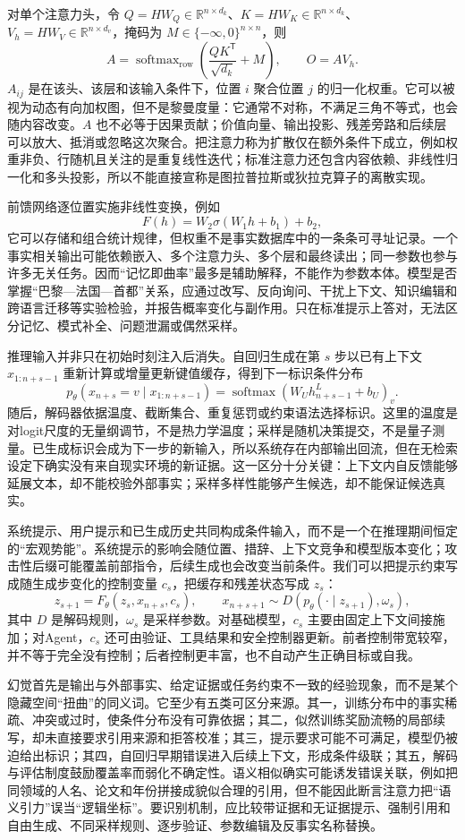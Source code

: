 对单个注意力头，令 $Q=HW_Q\in\mathbb R^{n\times d_k}$、$K=HW_K\in\mathbb R^{n\times d_k}$、$V_h=HW_V\in\mathbb R^{n\times d_v}$，掩码为 $M\in\{-\infty,0\}^{n\times n}$，则
\[
A=\operatorname{softmax}_{\mathrm{row}}
\left(\frac{QK^{\mathsf T}}{\sqrt{d_k}}+M\right),
\qquad
O=AV_h.
\]
$A_{ij}$ 是在该头、该层和该输入条件下，位置 $i$ 聚合位置 $j$ 的归一化权重。它可以被视为动态有向加权图，但不是黎曼度量：它通常不对称，不满足三角不等式，也会随内容改变。$A$ 也不必等于因果贡献；价值向量、输出投影、残差旁路和后续层可以放大、抵消或忽略这次聚合。把注意力称为扩散仅在额外条件下成立，例如权重非负、行随机且关注的是重复线性迭代；标准注意力还包含内容依赖、非线性归一化和多头投影，所以不能直接宣称是图拉普拉斯或狄拉克算子的离散实现。

前馈网络逐位置实施非线性变换，例如
\[
F(h)=W_2\sigma(W_1h+b_1)+b_2,
\]
它可以存储和组合统计规律，但权重不是事实数据库中的一条条可寻址记录。一个事实相关输出可能依赖嵌入、多个注意力头、多个层和最终读出；同一参数也参与许多无关任务。因而“记忆即曲率”最多是辅助解释，不能作为参数本体。模型是否掌握“巴黎—法国—首都”关系，应通过改写、反向询问、干扰上下文、知识编辑和跨语言迁移等实验检验，并报告概率变化与副作用。只在标准提示上答对，无法区分记忆、模式补全、问题泄漏或偶然采样。

推理输入并非只在初始时刻注入后消失。自回归生成在第 $s$ 步以已有上下文 $x_{1:n+s-1}$ 重新计算或增量更新键值缓存，得到下一标识条件分布
\[
p_\theta(x_{n+s}=v\mid x_{1:n+s-1})
=\operatorname{softmax}(W_Uh_{n+s-1}^L+b_U)_v.
\]
随后，解码器依据温度、截断集合、重复惩罚或约束语法选择标识。这里的温度是对logit尺度的无量纲调节，不是热力学温度；采样是随机决策提交，不是量子测量。已生成标识会成为下一步的新输入，所以系统存在内部输出回流，但在无检索设定下确实没有来自现实环境的新证据。这一区分十分关键：上下文内自反馈能够延展文本，却不能校验外部事实；采样多样性能够产生候选，却不能保证候选真实。

系统提示、用户提示和已生成历史共同构成条件输入，而不是一个在推理期间恒定的“宏观势能”。系统提示的影响会随位置、措辞、上下文竞争和模型版本变化；攻击性后缀可能覆盖前部指令，后续生成也会改变当前条件。我们可以把提示约束写成随生成步变化的控制变量 $c_s$，把缓存和残差状态写成 $z_s$：
\[
z_{s+1}=F_\theta(z_s,x_{n+s},c_s),
\qquad
x_{n+s+1}\sim D(p_\theta(\cdot\mid z_{s+1}),\omega_s),
\]
其中 $D$ 是解码规则，$\omega_s$ 是采样参数。对基础模型，$c_s$ 主要由固定上下文间接施加；对Agent，$c_s$ 还可由验证、工具结果和安全控制器更新。前者控制带宽较窄，并不等于完全没有控制；后者控制更丰富，也不自动产生正确目标或自我。

幻觉首先是输出与外部事实、给定证据或任务约束不一致的经验现象，而不是某个隐藏空间“扭曲”的同义词。它至少有五类可区分来源。其一，训练分布中的事实稀疏、冲突或过时，使条件分布没有可靠依据；其二，似然训练奖励流畅的局部续写，却未直接要求引用来源和拒答校准；其三，提示要求可能不可满足，模型仍被迫给出标识；其四，自回归早期错误进入后续上下文，形成条件级联；其五，解码与评估制度鼓励覆盖率而弱化不确定性。语义相似确实可能诱发错误关联，例如把同领域的人名、论文和年份拼接成貌似合理的引用，但不能因此断言注意力把“语义引力”误当“逻辑坐标”。要识别机制，应比较带证据和无证据提示、强制引用和自由生成、不同采样规则、逐步验证、参数编辑及反事实名称替换。

